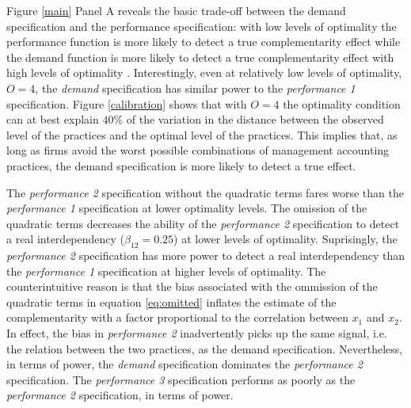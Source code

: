 \documentclass[12pt]{article}
\begin{document}
Figure \ref{main} Panel A reveals the basic trade-off between the demand specification and the performance specification: with low levels of optimality the performance function is more likely to detect a true complementarity effect while the demand function is more likely to detect a true complementarity effect with high levels of optimality \citep{grabner_management_2013, aral_three-way_2012, johansson_testing_2018}. Interestingly, even at relatively low levels of optimality, $O = 4$, the \emph{demand} specification has similar power to the \emph{performance 1} specification. Figure \ref{calibration} shows that with $O=4$ the optimality condition can at best explain $40\%$ of the variation in the distance between the observed level of the practices and the optimal level of the practices. This implies that, as long as firms avoid the worst possible combinations of management accounting practices, the demand specification is more likely to detect a true effect.

The \emph{performance 2} specification without the quadratic terms fares worse than the \emph{performance 1} specification at lower optimality levels. The omission of the quadratic terms decreases the ability of the \emph{performance 2} specification to detect a real interdependency ($\beta_{12} = 0.25$) at lower levels of optimality. Suprisingly, the \emph{performance 2} specification has more power to detect a real interdependency than the \emph{performance 1} specification at higher levels of optimality. The counterintuitive reason is that the bias associated with the ommission of the quadratic terms in equation \ref{eq:omitted} inflates the estimate of the complementarity with a factor proportional to the correlation between $x_1$ and $x_2$. In effect, the bias in \emph{performance 2} inadvertently picks up the same signal, i.e. the relation between the two practices, as the demand specification. Nevertheless, in terms of power, the \emph{demand} specification dominates the \emph{performance 2} specification. The \emph{performance 3} specification performs as poorly as the \emph{performance 2}  specification, in terms of power. 
\end{document}
